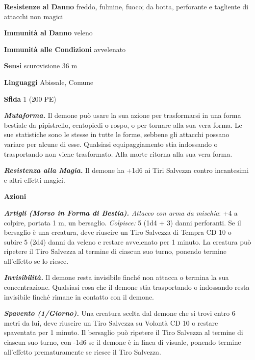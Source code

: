 \begin{multicols}{2}
\textbf{Resistenze al Danno} freddo, fulmine, fuoco; da botta, perforante e tagliente di attacchi non magici

\textbf{Immunità al Danno} veleno 

\textbf{Immunità alle Condizioni}
avvelenato

\textbf{Sensi} scurovisione 36 m

\textbf{Linguaggi} Abissale, Comune

\textbf{Sfida} 1 (200 PE)

\emph{\textbf{Mutaforma.}} Il demone può usare la sua azione per trasformarsi in una forma bestiale da pipistrello, centopiedi o rospo, o per tornare alla sua vera forma. Le sue statistiche sono le stesse in tutte le forme, sebbene gli attacchi possano variare per alcune di esse. Qualsiasi equipaggiamento stia indossando o trasportando non viene trasformato. Alla morte ritorna alla sua vera forma.

\emph{\textbf{Resistenza alla Magia.}} Il demone ha +1d6 ai Tiri Salvezza contro incantesimi e altri effetti magici.

\textbf{Azioni}

\emph{\textbf{Artigli (Morso in Forma di Bestia).} Attacco con arma da  mischia}: +4 a colpire, portata 1 m, un bersaglio. \emph{Colpisce:} 5 (1d4 + 3) danni perforanti. Se il bersaglio è una creatura, deve riuscire un Tiro Salvezza di Tempra CD 10 o subire 5 (2d4) danni da veleno e restare avvelenato per 1 minuto. La creatura può ripetere il Tiro Salvezza al termine di ciascun suo turno, ponendo termine all'effetto se lo riesce.

\emph{\textbf{Invisibilità.}} Il demone resta invisibile finché non attacca o termina la sua concentrazione. Qualsiasi cosa che il demone stia trasportando o indossando resta invisibile finché rimane in contatto con il demone.

\emph{\textbf{Spavento (1/Giorno).}} Una creatura scelta dal demone che si trovi entro 6 metri da lui, deve riuscire un Tiro Salvezza su Volontà CD 10 o restare spaventata per 1 minuto. Il bersaglio può ripetere il Tiro Salvezza al termine di ciascun suo turno, con -1d6 se il demone è in linea di visuale, ponendo termine all'effetto prematuramente se riesce il Tiro Salvezza.


\end{multicols}
